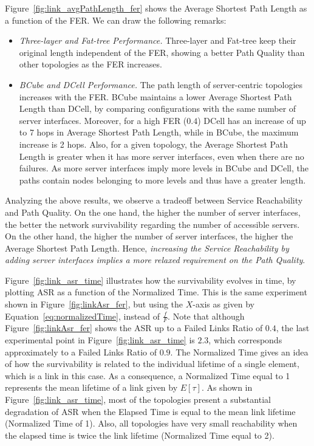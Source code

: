 Figure~\ref{fig:link_avgPathLength_fer} shows the Average Shortest Path Length as a function of the FER. We can draw the following remarks:
\begin{itemize}
\item \textit{Three-layer and Fat-tree Performance.} Three-layer and Fat-tree keep their original length independent of the FER, showing a better Path Quality than other topologies as the FER increases.
\item \textit{BCube and DCell Performance.} The path length of server-centric topologies increases with the FER. BCube maintains a lower Average Shortest Path Length than DCell, by comparing configurations with the same number of server interfaces. Moreover, for a high FER ($0.4$) DCell has an increase of up to 7 hops in Average Shortest Path Length, while in BCube, the maximum increase is 2 hops. Also, for a given topology, the Average Shortest Path Length is greater when it has more server interfaces, even when there are no failures. As more server interfaces imply more levels in BCube and DCell, the paths contain nodes belonging to more levels and thus have a greater length.
\end{itemize}

Analyzing the above results, we observe a tradeoff between Service Reachability and Path Quality. On the one hand, the higher the number of server interfaces, the better the network survivability regarding the number of accessible servers. On the other hand, the higher the number of server interfaces, the higher the Average Shortest Path Length. Hence, \textit{increasing the Service Reachability by adding server interfaces implies a more relaxed requirement on the Path Quality}. 

Figure~\ref{fig:link_asr_time} illustrates how the survivability evolves in time, by plotting ASR as a function of the Normalized Time.
This is the same experiment shown in Figure~\ref{fig:linkAsr_fer}, but using the $X$-axis as given by Equation~\ref{eq:normalizedTime}, instead of $\frac{f}{F}$. 
Note that although Figure~\ref{fig:linkAsr_fer} shows the ASR up to a Failed Links Ratio of $0.4$, the last experimental point in Figure~\ref{fig:link_asr_time} is $2.3$, which corresponds approximately to a Failed Links Ratio of $0.9$.
The Normalized Time gives an idea of how the survivability is related to the individual lifetime of a single element, which is a link in this case. As a consequence, a Normalized Time equal to 1 represents the mean lifetime of a link given by $E[\tau]$. As shown in Figure~\ref{fig:link_asr_time}, most of the topologies present a substantial degradation of ASR when the Elapsed Time is equal to the mean link lifetime (Normalized Time of 1). Also, all topologies have very small reachability when the elapsed time is twice the link lifetime (Normalized Time equal to 2).
